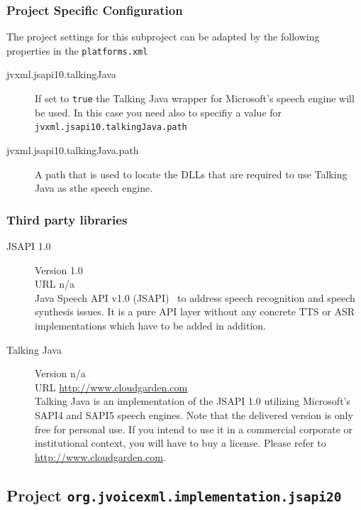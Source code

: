 \documentclass[11pt,a4paper]{article}
\begin{document}
\subsubsection{Project Specific Configuration}

The project settings for this subproject can be adapted by the following
properties in the \texttt{platforms.xml}

\begin{description}
\item[jvxml.jsapi10.talkingJava] If set to
\texttt{true} the Talking Java wrapper for Microsoft's speech engine will be
used. In this case you need also to specifiy a value for
\texttt{jvxml.jsapi10.talkingJava.path}
\item[jvxml.jsapi10.talkingJava.path] A path that is used to locate the DLLs
that are required to use Talking Java as sthe speech engine.
\end{description}

\subsubsection{Third party libraries}
\label{sec:jsapi10-third-party-libr}

\begin{description}
\item[JSAPI 1.0] Version 1.0 \\
URL n/a \\
Java Speech API v1.0 (JSAPI)~\cite{sun:jsapi} to address speech recognition and
speech synthesis issues. It is a pure API layer without any concrete TTS or ASR
implementations which have to be added in addition. 
\item[Talking Java] Version n/a \\
URL \url{http://www.cloudgarden.com} \\
Talking Java is an implementation of the JSAPI 1.0 utilizing Microsoft's
SAPI4 and SAPI5 speech engines. Note that the delivered version is only free
for personal use. If you intend to use it in a commercial corporate or
institutional context, you will have to buy a license. 
Please refer to \url{http://www.cloudgarden.com}.
\end{description}

\subsection{Project \texttt{org.jvoicexml.implementation.jsapi20}}
\label{sec:implementation-jsapi20}
\end{document}
